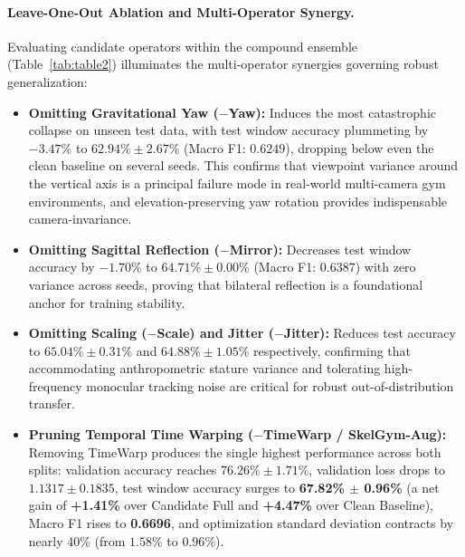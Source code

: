 \documentclass[runningheads]{llncs}
\begin{document}
\paragraph{Leave-One-Out Ablation and Multi-Operator Synergy.}
Evaluating candidate operators within the compound ensemble (Table~\ref{tab:table2}) illuminates the multi-operator synergies governing robust generalization:
\begin{itemize}
    \item \textbf{Omitting Gravitational Yaw ($-$Yaw):} Induces the most catastrophic collapse on unseen test data, with test window accuracy plummeting by $-3.47\%$ to $62.94\% \pm 2.67\%$ (Macro F1: $0.6249$), dropping below even the clean baseline on several seeds. This confirms that viewpoint variance around the vertical axis is a principal failure mode in real-world multi-camera gym environments, and elevation-preserving yaw rotation provides indispensable camera-invariance.
    \item \textbf{Omitting Sagittal Reflection ($-$Mirror):} Decreases test window accuracy by $-1.70\%$ to $64.71\% \pm 0.00\%$ (Macro F1: $0.6387$) with zero variance across seeds, proving that bilateral reflection is a foundational anchor for training stability.
    \item \textbf{Omitting Scaling ($-$Scale) and Jitter ($-$Jitter):} Reduces test accuracy to $65.04\% \pm 0.31\%$ and $64.88\% \pm 1.05\%$ respectively, confirming that accommodating anthropometric stature variance and tolerating high-frequency monocular tracking noise are critical for robust out-of-distribution transfer.
    \item \textbf{Pruning Temporal Time Warping ($-$TimeWarp / SkelGym-Aug):} Removing TimeWarp produces the single highest performance across both splits: validation accuracy reaches \textbf{$76.26\% \pm 1.71\%$}, validation loss drops to \textbf{$1.1317 \pm 0.1835$}, test window accuracy surges to \textbf{67.82\% $\pm$ 0.96\%} (a net gain of \textbf{+1.41\%} over Candidate Full and \textbf{+4.47\%} over Clean Baseline), Macro F1 rises to \textbf{0.6696}, and optimization standard deviation contracts by nearly 40\% (from $1.58\%$ to $0.96\%$).
\end{itemize}
\end{document}
